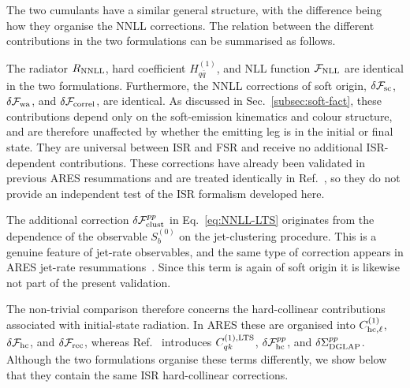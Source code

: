 The two cumulants have a similar general structure, with the difference being how they organise the NNLL
corrections. The relation between the different contributions in the two formulations can be summarised as follows.

The radiator $R_{\rm NNLL}$, hard coefficient $H^{(1)}_{q\bar{q}}$,
and NLL function $\mathcal{F}_{\rm NLL}$ are identical in the two
formulations. Furthermore, the NNLL corrections of soft origin,
$\delta\mathcal{F}_{\rm sc}$, $\delta\mathcal{F}_{\rm wa}$, and
$\delta\mathcal{F}_{\rm correl}$, are identical. As discussed in
Sec.~\ref{subsec:soft-fact}, these contributions depend only on the
soft-emission kinematics and colour structure, and are therefore
unaffected by whether the emitting leg is in the initial or final
state. They are universal between ISR and FSR and receive no additional
ISR-dependent contributions. These corrections have already been
validated in previous \textsc{ARES} resummations and are treated
identically in Ref.~\cite{vanBeekveld:2025zjh}, so they do not provide
an independent test of the ISR formalism developed here.

The additional correction $\delta\mathcal{F}^{pp}_{\rm clust}$ in
Eq.~\eqref{eq:NNLL-LTS} originates from the dependence of the observable
$S_b^{(0)}$ on the jet-clustering procedure. This is a genuine feature
of jet-rate observables, and the same type of correction appears in
\textsc{ARES} jet-rate resummations~\cite{Banfi:2016zlc}. Since this
term is again of soft origin it is likewise not part of the present validation.

The non-trivial comparison therefore concerns the hard-collinear
contributions associated with initial-state radiation. In \textsc{ARES}
these are organised into $C_{{\rm hc},\ell}^{(1)}$,
$\delta\mathcal{F}_{\rm hc}$, and $\delta\mathcal{F}_{\rm rec}$,
whereas Ref.~\cite{vanBeekveld:2025zjh} introduces
$C_{qk}^{(1),\rm LTS}$, $\delta\mathcal{F}^{pp}_{\rm hc}$, and
$\delta\Sigma^{pp}_{\rm DGLAP}$. Although the two formulations organise
these terms differently, we show below that they contain the same ISR
hard-collinear corrections.

